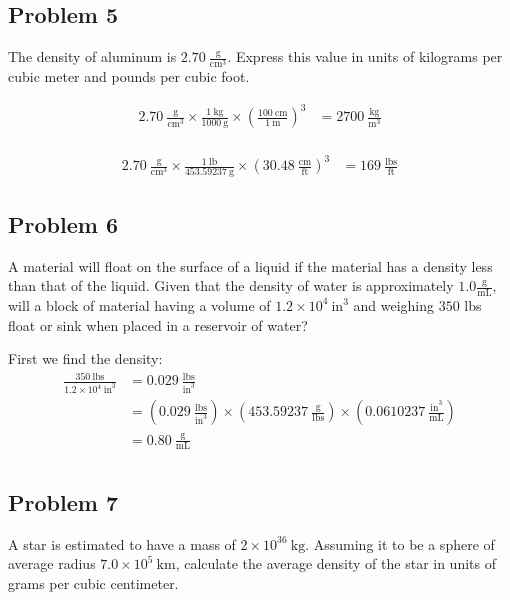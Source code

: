 \documentclass[11pt]{scrartcl}
\begin{document}
\subsection{Problem 5}
The density of aluminum is $2.70\ \frac{\text{g}}{\text{cm}^3}$.
Express this value in units of kilograms per cubic meter and pounds per cubic foot.

\begin{align*}
    2.70\ \frac{\text{g}}{\text{cm}^3} \times \frac{1\ \text{kg}}{1000\ \text{g}} \times \left (\frac{100 \ \text{cm}}{1\ \text{m}} \right)^3 &= \boxed{2700\ \frac{\text{kg}}{\text{m}^3}} \\
\end{align*}

\begin{align*}
    2.70\ \frac{\text{g}}{\text{cm}^3} \times  \frac{1\ \text{lb}}{453.59237\ \text{g}} \times \left ( 30.48\ \frac{\text{cm}}{\text{ft}} \right)^3 &= \boxed{169\ \frac{\text{lbs}}{\text{ft}}}
\end{align*}

\newpage
\subsection{Problem 6}
 A material will float on the surface of a liquid if the material has a density less than that of the liquid.
 Given that the density of water is approximately $1.0 \frac{\text{g}}{\text{mL}}$, will a block of material having a volume of $1.2 \times 10^4 \ \text{in}^3$ and weighing $350$ lbs float or sink when placed in a reservoir of water?


\noindent First we find the density:
\begin{align*}
    \frac{350\ \text{lbs}}{1.2 \times 10^{4}\ \text{in}^3} &= 0.029\ \frac{\text{lbs}}{\text{in}^3} \\
    &= \left ( 0.029\ \frac{\text{lbs}}{\text{in}^3} \right) \times \left (453.59237\ \frac{\text{g}}{\text{lbs}} \right)  \times \left (0.0610237\ \frac{\text{in}^3}{\text{mL}} \right) \\
    &= \boxed{0.80\ \frac{\text{g}}{\text{mL}}} \\
\end{align*}

\newpage
\subsection{Problem 7}
A star is estimated to have a mass of $2 \times 10^{36}\ \text{kg}$.
Assuming it to be a sphere of average radius $7.0 \times 10^{5} \ \text{km}$, calculate the average density of the star in units of grams per cubic centimeter.
\end{document}
